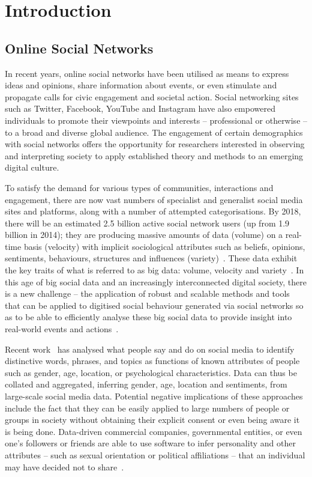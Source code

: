 \documentclass{llncs}
\begin{document}
\section{Introduction}\label{intro}

\subsection{Online Social Networks}
 
In recent years, online social networks have been utilised as
means to express ideas and opinions, share information about events,
or even stimulate and propagate calls for civic engagement and
societal action. Social networking sites such as Twitter, Facebook,
YouTube and Instagram have also empowered individuals to promote their
viewpoints and interests -- professional or otherwise -- to a broad
and diverse global audience. The engagement of certain demographics
with social networks offers the opportunity for researchers interested
in observing and interpreting society to apply established theory and
methods to an emerging digital culture.

To satisfy the demand for various types of communities, interactions
and engagement, there are now vast numbers of specialist and
generalist social media sites and platforms, along with a number of
attempted categorisations. By 2018, there will be an estimated 2.5
billion active social network users (up from 1.9 billion in 2014);
they are producing massive amounts of data (volume) on a real-time
basis (velocity) with implicit sociological attributes such as
beliefs, opinions, sentiments, behaviours, structures and influences
(variety)~\cite{burnap-et-al:2015}. These data exhibit the key traits
of what is referred to as big data: volume, velocity and
variety~\cite{postsm:2014}. In this age of big social data and an
increasingly interconnected digital society, there is a new challenge
-- the application of robust and scalable methods and tools that can
be applied to digitised social behaviour generated via social networks
so as to be able to efficiently analyse these big social data to
provide insight into real-world events and
actions~\cite{lazer-et-al:2009,burnap-et-al:2015}.

Recent
work~\cite{blamey-et-al-2012,schwartz-et-al:2013,blamey-et-al-2013,oatley+crick:2014,oatley-et-al-soccogcomp2015,mostafa-et-al-ai2016}
has analysed what people say and do on social media to identify
distinctive words, phrases, and topics as functions of known
attributes of people such as gender, age, location, or psychological
characteristics. Data can thus be collated and aggregated, inferring
gender, age, location and sentiments, from large-scale social media
data. Potential negative implications of these approaches include the
fact that they can be easily applied to large numbers of people or
groups in society without obtaining their explicit consent or even
being aware it is being done. Data-driven commercial companies,
governmental entities, or even one's followers or friends are able to
use software to infer personality and other attributes -- such as
sexual orientation or political affiliations -- that an individual may
have decided not to share~\cite{lambiotte+kosinski:2014,postsm:2014}.
\end{document}

